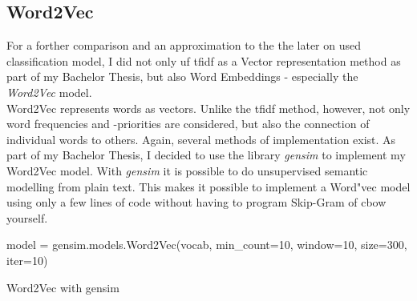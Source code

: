 \documentclass[a4paper, 11pt,titlepage,oneside,openany]{book}
\begin{document}
\newpage
\subsection{Word2Vec} 
For a forther comparison and an approximation to the the later on used classification model, I did not only uf \gls{tfidf} as a Vector representation method as part of my Bachelor Thesis, but also Word Embeddings - especially the \textit{Word2Vec} model. \\
\noindent Word2Vec represents words as vectors. Unlike the  \gls{tfidf} method, however, not only word frequencies and -priorities are considered, but also the connection of individual words to others. Again, several methods of implementation exist. 
\noindent As part of my Bachelor Thesis, I decided to use  the library \textit{gensim} \cite{gensim} to implement my Word2Vec model. With \textit{gensim} it is  possible to do  unsupervised semantic modelling from plain text. This makes it possible to implement a Word"vec model using only a few lines of code without having to program Skip-Gram of \gls{cbow} yourself. \\

\begin{algorithm}[H]
	\DontPrintSemicolon
    model = gensim.models.Word2Vec(vocab, min\_count=10, window=10, size=300, iter=10)\;
	\caption{Word2Vec with gensim}
\end{algorithm}
\end{document}
